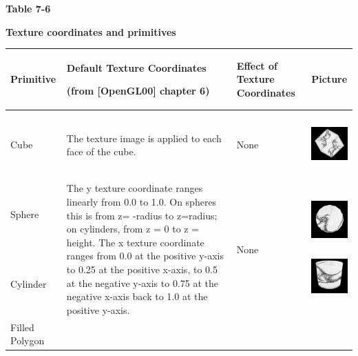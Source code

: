 \begin{center}
{\sffamily\bfseries Table 7-6}

{\sffamily\bfseries Texture coordinates and primitives}

\tablehead{}
\begin{supertabular}{|m{0.712in}|m{3.36in}|m{0.9in}|m{0.7in}|}
\hline
Primitive &
Default Texture Coordinates

(from [OpenGL00] chapter 6) &
Effect of Texture Coordinates &
Picture\\\hline
Cube &
The texture image is applied to each face of the cube.  &
None &
\begin{center}
\includegraphics[width=0.6602in,height=0.6602in]{ub-img/ub-img24.jpg}
\end{center}
\\\hline
Sphere

~

~

Cylinder &
The y texture coordinate ranges linearly from 0.0 to 1.0. On spheres
this is from\newline
z= -radius to z=radius; on cylinders, from\newline
z = 0 to z = height. The x texture coordinate ranges from 0.0 at the
positive y-axis to 0.25 at the positive x-axis, to 0.5 at the
negative\newline
y-axis to 0.75 at the negative x-axis back to 1.0 at the positive
y-axis.  &
None &


\begin{center}
\includegraphics[width=0.6602in,height=0.6602in]{ub-img/ub-img25.jpg}
\end{center}
\begin{center}
\includegraphics[width=0.6602in,height=0.6602in]{ub-img/ub-img26.jpg}
\end{center}
\\\hline
Filled Polygon


\end{supertabular}
\end{center}
